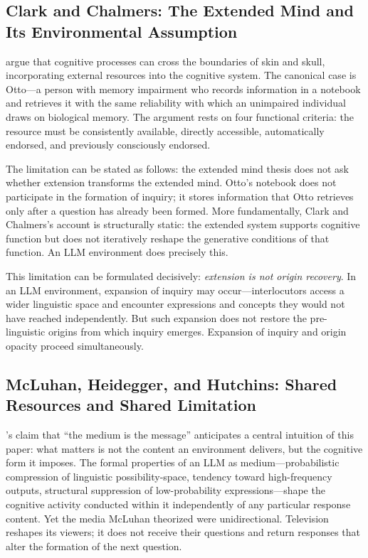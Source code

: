 \documentclass[12pt]{article}
\begin{document}
\subsection{Clark and Chalmers: The Extended Mind and Its Environmental Assumption}

\citet{clark1998} argue that cognitive processes can cross the boundaries of skin and skull, incorporating external resources into the cognitive system. The canonical case is Otto---a person with memory impairment who records information in a notebook and retrieves it with the same reliability with which an unimpaired individual draws on biological memory. The argument rests on four functional criteria: the resource must be consistently available, directly accessible, automatically endorsed, and previously consciously endorsed.

The limitation can be stated as follows: the extended mind thesis does not ask whether extension transforms the extended mind. Otto's notebook does not participate in the formation of inquiry; it stores information that Otto retrieves only after a question has already been formed. More fundamentally, Clark and Chalmers's account is structurally static: the extended system supports cognitive function but does not iteratively reshape the generative conditions of that function. An LLM environment does precisely this.

This limitation can be formulated decisively: \emph{extension is not origin recovery}. In an LLM environment, expansion of inquiry may occur---interlocutors access a wider linguistic space and encounter expressions and concepts they would not have reached independently. But such expansion does not restore the pre-linguistic origins from which inquiry emerges. Expansion of inquiry and origin opacity proceed simultaneously.

\subsection{McLuhan, Heidegger, and Hutchins: Shared Resources and Shared Limitation}

\citet{mcluhan1964}'s claim that ``the medium is the message'' anticipates a central intuition of this paper: what matters is not the content an environment delivers, but the cognitive form it imposes. The formal properties of an LLM as medium---probabilistic compression of linguistic possibility-space, tendency toward high-frequency outputs, structural suppression of low-probability expressions---shape the cognitive activity conducted within it independently of any particular response content. Yet the media McLuhan theorized were unidirectional. Television reshapes its viewers; it does not receive their questions and return responses that alter the formation of the next question.
\end{document}
